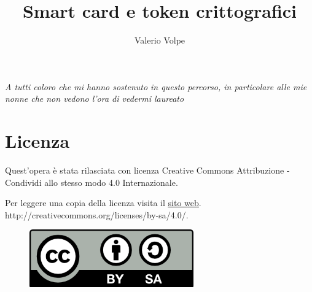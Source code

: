 \documentclass[a4paper,12pt, oneside]{book}
\title{Smart card e token crittografici}
\author{Valerio Volpe}
\begin{document}
\frontmatter



\chapter*{}

\begin{flushright}%
  \emph{A tutti coloro che mi hanno sostenuto in questo percorso, in particolare alle mie nonne che non vedono l'ora di vedermi laureato}
  \thispagestyle{empty}
\end{flushright}



\tableofcontents
\thispagestyle{empty}

\medskip
\mainmatter







\medskip




\chapter*{Licenza}

Quest'opera è stata rilasciata con licenza Creative Commons Attribuzione - Condividi allo stesso modo 4.0 Internazionale.

Per leggere una copia della licenza visita il 
\href{http://creativecommons.org/licenses/by-sa/4.0/}{\underline{sito web}}.
\newline
http://creativecommons.org/licenses/by-sa/4.0/.

\begin{figure}[h!]
  \centering
  \includegraphics[width=200pt]{pictures/by-sa.png}
  \label{fig:licenza}
\end{figure}
\end{document}
